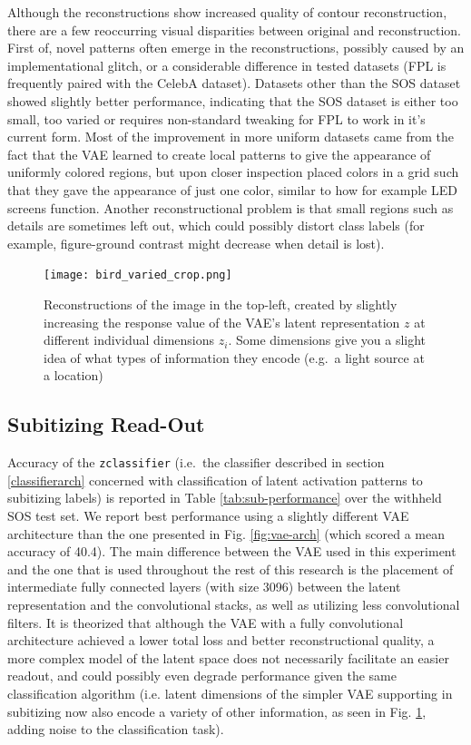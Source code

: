 \documentclass[twocolumn]{article}
\begin{document}
Although the reconstructions show increased quality of contour
reconstruction, there are a few reoccurring visual disparities between
original and reconstruction. First of, novel patterns often emerge in
the reconstructions, possibly caused by an implementational glitch, or a
considerable difference in tested datasets (FPL is frequently paired
with the CelebA \citet{liu2015deep} dataset). Datasets other than the
SOS dataset showed slightly better performance, indicating that the SOS
dataset is either too small, too varied or requires non-standard tweaking
for FPL to work in it's current form. Most of the improvement in more
uniform datasets came from the fact that the VAE learned to create 
local patterns to give the appearance of uniformly colored regions, but
upon closer inspection placed colors in a grid such that they
gave the appearance of just one color, similar to how for example LED
screens function. Another reconstructional problem is that small regions such as details are sometimes left out, which
could possibly distort class labels (for example, figure-ground contrast might decrease when detail is lost).

\begin{figure}
\centering
\texttt{[image: bird\_varied\_crop.png]}
\caption{Reconstructions of the image in the top-left, created by slightly
increasing the response value of the VAE's latent representation \(z\) at different individual dimensions \(z_i\). Some dimensions give
you a slight idea of what types of information they encode (e.g.~a light source at a
location)}
\label{fig:latent}
\end{figure}

\hypertarget{subitizing-read-out}{%
\subsection{Subitizing Read-Out}\label{subitizing-read-out}}

Accuracy of the \texttt{zclassifier} (i.e.~the classifier described
in section \ref{classifierarch} concerned
with classification of latent activation patterns to subitizing labels)
is reported in Table \ref{tab:sub-performance} over the withheld SOS test set. We report best performance using a slightly different VAE architecture than the one presented in
Fig. \ref{fig:vae-arch} (which scored a mean accuracy of 40.4).
The main difference between the VAE used in this experiment and the one
that is used throughout the rest of this research is the placement of
intermediate fully connected layers (with size 3096) between the latent
representation and the convolutional stacks, as well as utilizing less convolutional filters. It is theorized that although the VAE with a fully convolutional architecture achieved a lower total loss and better reconstructional quality, a more complex model of the latent space does not necessarily facilitate an easier readout, and could possibly even degrade performance given the same classification algorithm (i.e. latent dimensions of the simpler VAE supporting in subitizing now also encode a variety of other information, as seen in Fig. \ref{fig:latent}, adding noise to the classification task). 
\end{document}
